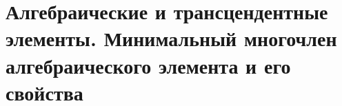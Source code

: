\section{Алгебраические и трансцендентные элементы. Минимальный многочлен алгебраического элемента и его свойства}